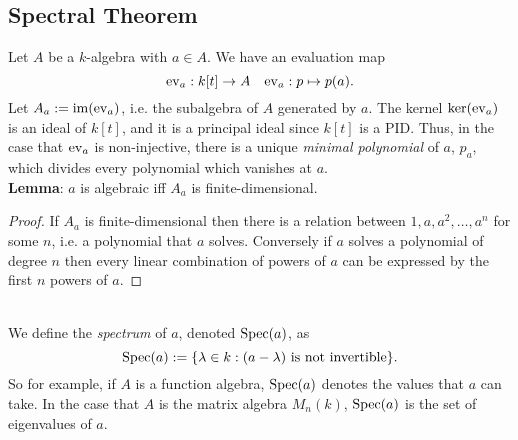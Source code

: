 \documentclass{amsart}
\begin{document}
\subsection{Spectral Theorem}

Let $A$ be a $k$-algebra with $a\in A$. We have an evaluation map
$$
\operatorname{ev}_a : k[t] \to A \;\;\; \operatorname{ev}_a: p\mapsto p(a).
$$
Let $A_a:= \operatorname{im}(\operatorname{ev}_a)$, i.e. the subalgebra of $A$ generated by $a$. The kernel $\ker(\operatorname{ev}_a)$ is an ideal of $k[t]$, and it is a principal ideal since $k[t]$ is a PID. Thus, in the case that $\operatorname{ev}_a$ is non-injective, there is a unique \textit{minimal polynomial} of $a$, $p_a$, which divides every polynomial which vanishes at $a$.\\

\noindent \textbf{Lemma}: $a$ is algebraic iff $A_a$ is finite-dimensional.
\begin{proof}
	If $A_a$ is finite-dimensional then there is a relation between $1,a,a^2,\dots,a^n$ for some $n$, i.e. a polynomial that $a$ solves. Conversely if $a$ solves a polynomial of degree $n$ then every linear combination of powers of $a$ can be expressed by the first $n$ powers of $a$.
\end{proof}\\

We define the \textit{spectrum} of $a$, denoted $\operatorname{Spec}(a)$, as
$$
\operatorname{Spec}(a) := \{\lambda \in k : (a-\lambda) \text{ is not invertible}\}.
$$
So for example, if $A$ is a function algebra, $\operatorname{Spec}(a)$ denotes the values that $a$ can take. In the case that $A$ is the matrix algebra $M_n(k)$, $\operatorname{Spec}(a)$ is the set of eigenvalues of $a$.\\
\end{document}
